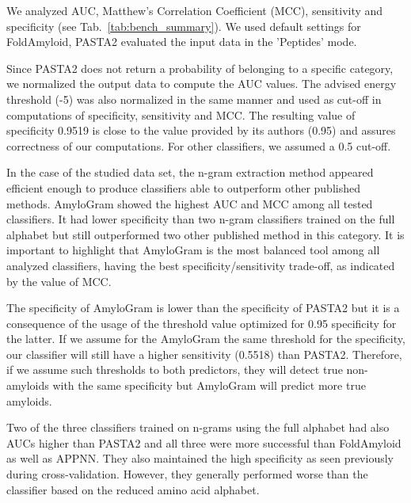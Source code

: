 \documentclass[fleqn,10pt,twoside]{gcb15submission}
\begin{document}
  We analyzed AUC, Matthew's Correlation Coefficient 
%
%
%
(MCC), sensitivity and specificity (see Tab.~\ref{tab:bench_summary}). We used 
default settings for FoldAmyloid, PASTA2 evaluated the input data in the 
'Peptides' mode.

  Since PASTA2 does not return a probability of belonging to a specific category, 
we normalized the output data to compute the AUC values. The advised energy 
threshold (-5) was also normalized in the same manner and used as cut-off in 
computations of specificity, sensitivity and MCC. The resulting value of 
specificity 0.9519 is close to the value provided by its authors (0.95) and assures 
correctness of our computations. For other classifiers, we assumed a 0.5 cut-off.
    
  In the case of the studied data set, the n-gram extraction method appeared 
efficient enough to produce classifiers able to outperform other published 
methods. AmyloGram showed the highest AUC and MCC among all tested classifiers. 
It had lower specificity than two n-gram classifiers trained on the full 
alphabet but still outperformed two other published method in this category. It 
is important to highlight that AmyloGram is the most balanced tool among all analyzed 
classifiers, having the best specificity/sensitivity trade-off, as indicated by 
the value of MCC.
 
  The specificity of AmyloGram is lower than the specificity of PASTA2 but it is 
a consequence of the usage of the threshold value optimized for 0.95 specificity 
for the latter. If we assume for the AmyloGram the same threshold for the 
specificity, our classifier will still have a higher sensitivity (0.5518) than 
PASTA2. Therefore, if we assume such thresholds to both predictors, they will detect true 
non-amyloids with the same specificity but AmyloGram will predict more true amyloids. 

  Two of  the three classifiers trained on  n-grams using  the full alphabet 
%
%
%
%
%
had also AUCs higher than PASTA2 and all three were more successful than 
FoldAmyloid as well as APPNN. They also maintained the high specificity as seen 
previously during cross-validation. However, they generally performed worse than 
the classifier based on the reduced amino acid alphabet.
  
\end{document}
